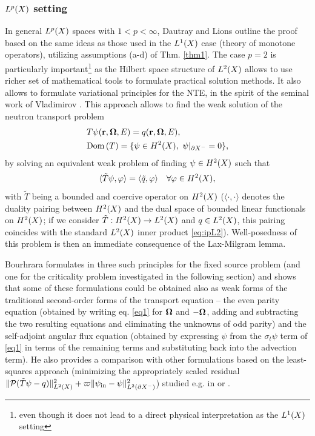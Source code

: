\subsubsection{$\Lp(X)$ setting}\label{sec:L2}
In general $\Lp(X)$ spaces with $1 < p < \infty$, Dautray and Lions outline the proof based on the same ideas as those 
used in the $\Lp[1](X)$ case (theory of monotone operators), utilizing assumptions (a-d) of Thm. \ref{thm1}.  The case
$p = 2$ is particularly important\footnote{even though it does not lead to a direct physical interpretation as  the
$\Lp[1](X)$ setting} as the Hilbert space structure of $\Lp[2](X)$ allows to use richer set of mathematical tools to 
formulate practical solution methods. It also allows to formulate variational principles for the NTE, in the spirit of 
the seminal work of Vladimirov \cite{Vladimirov}. This approach allows to find the weak solution of the neutron 
transport problem $$
\begin{aligned}
     &T\psi(\br,\bomega,E) = q(\br,\bomega,E),\\
     &\Dom{T} = \{\psi\in \Hp[2](X),\ \psi\vert_{\pX[-]} = 0\},
  \end{aligned}
$$
by solving an equivalent weak problem of finding $\psi\in\Hp[2](X)$ such that
\begin{equation}\label{eq:weakform}
	\langle \tilde{T}\psi, \varphi \rangle = \langle \tilde{q}, \varphi \rangle  \quad \forall \varphi\in \Hp[2](X),
\end{equation}
with $\tilde{T}$ being a bounded and coercive operator on $\Hp[2](X)$ ($\langle \cdot,\cdot\rangle$ denotes the
duality pairing between $\Hp[2](X)$ and the dual space of bounded linear functionals on $\Hp[2](X)$; if we consider
$\tilde{T} : \Hp[2](X) \to \Lp[2](X)$ and $q\in \Lp[2](X)$, this pairing coincides with the standard $\Lp[2](X)$ inner
product \eqref{eq:ipL2}). Well-posedness of this problem is then an immediate consequence of the Lax-Milgram lemma. 

Bourhrara formulates in \cite{Bourhrara2} three such principles for the fixed source problem (and one for the
criticality problem investigated in the following section) and shows that some of these formulations could be obtained
also as weak forms of the traditional second-order forms of the transport equation -- the even parity equation (obtained
by writing eq.
\eqref{eq1} for $\bomega$ and $-\bomega$, adding and subtracting the two resulting equations and eliminating the
unknowns of odd parity) and the self-adjoint angular flux equation (obtained by
expressing $\psi$ from the $\sigma_t\psi$ term of \eqref{eq1} in terms of the remaining terms and substituting back into
the advection term). He also provides a comparison with other formulations based on the least-squares approach
(minimizing the appropriately scaled residual \mbox{$\norm[{\Lp[2](X)}]{\mathcal{P}(\tilde T \psi - q)}^2 +
\varpi\norm[{\Lp[2](\pX[-])}]{\psi_{\text{in}} - \psi}^2$}) studied e.g. in \cite{Manteuffel} or
\cite{Agoshkov}. 

